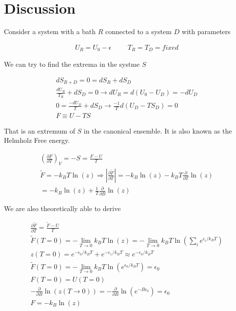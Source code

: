 \documentclass[fleqn]{report}
\newcommand{\hp}{\hspace{1cm}}
\newcommand{\del}{\partial}
\newcommand{\equations} [1] {
\begin{gather*}
#1
\end{gather*}
}
\begin{document}
\section{Discussion}
Consider a system with a bath $R$ connected to a system $D$ with parameters 
\equations{
    U_R 
    =
    U_0 - \epsilon 
    \hp 
    T_R = T_D = fixed 
}

We can try to find the extrema in the systme $S$ 
\equations{
    dS_{R + D}
    =
    0 
    =
    dS_R + dS_D 
    \\
    \frac{dU_R}{T_R}
    +
    dS_D 
    =
    0
    \rightarrow 
    dU_R 
    =
    d(U_0 - U_D)
    =
    -dU_D
    \\
    0
    =
    \frac{-dU_D}{T}
    + dS_D 
    \rightarrow 
    \frac{-1}{T} 
    d (U_D - TS_D)
    =
    0
    \\
    F 
    \equiv 
    U - TS
}
That is an extremum of $S$ in the canonical ensemble. It is also 
known as the Helmholz Free energy. 

\equations{
    \left(
        \frac{\del F}{\del T}
    \right)_V 
    =
    -S 
    =
    \frac{F - U}{T} 
    \\
    \tilde F = 
    - k_B T \ln(z)
    \Rightarrow 
    |\frac{\del \tilde F }{\del T}| 
    =
    -k_B \ln(z) 
    -
    k_B T \frac{\del}{\del T}
    \ln(z) 
    \\
    =
    -k_B \ln(z)
    +
    \frac{1}{T}
    \frac{\del}{\del B } \ln(z)
}

We are also theoretically able to derive 
\equations{
    \frac{\del \tilde F}{\del T}
    =
    \frac{\tilde F - U}{T }
    \\
    \tilde F(T=0)
    =
    - \lim_{T \to 0}
    k_B T \ln(z) 
    =
    - \lim_{T \to 0}
    k_B T 
    \ln(\sum_i e^{\epsilon_i / k_B T})
    \\
    z(T = 0)
    =
    e^{-\epsilon_0 / k_B T}
    +
    e^{-\epsilon_1 / k_B T}
    \approx 
    e^{-\epsilon_0 / k_B T}
    \\
    \tilde F(T=0)
    =
    - \lim_{T \to 0}
    k_B T 
    \ln(e^{\epsilon_0 / k_B T})
    =
    \epsilon_0
    \\
    F(T=0)
    =
    U(T=0)
    \\
    - \frac{\del}{\del B}
    \ln(z(T \to 0))
    =
    - \frac{\del}{\del B}
    \ln(e^{-B \epsilon_0})
    =
    \epsilon_0 
    \\
    F 
    =
    -k_B \ln(z)
}
\end{document}
